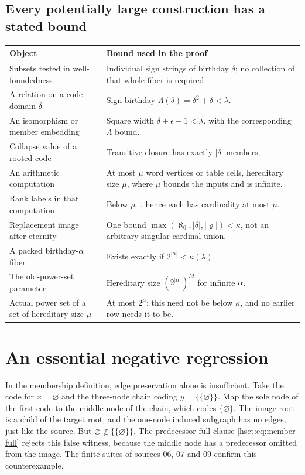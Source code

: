 \documentclass[11pt,letterpaper]{article}
\theoremstyle{definition}
\theoremstyle{remark}
\newcommand{\card}[1]{\lvert#1\rvert}
\begin{document}
\subsection{Every potentially large construction has a stated bound}

\begin{longtable}{@{}P{0.35\textwidth}P{0.56\textwidth}@{}}
\toprule
Object & Bound used in the proof\\
\midrule\endhead
Subsets tested in well-foundedness & Individual sign strings of birthday $\delta$; no collection of that whole fiber is required.\\[0.4em]
A relation on a code domain $\delta$ & Sign birthday $\Lambda(\delta)=\delta^2+\delta<\lambda$.\\[0.4em]
An isomorphism or member embedding & Square width $\delta+\epsilon+1<\lambda$, with the corresponding $\Lambda$ bound.\\[0.4em]
Collapse value of a rooted code & Transitive closure has exactly $\card\delta$ members.\\[0.4em]
An arithmetic computation & At most $\mu$ word vertices or table cells, hereditary size $\mu$, where $\mu$ bounds the inputs and is infinite.\\[0.4em]
Rank labels in that computation & Below $\mu^+$, hence each has cardinality at most $\mu$.\\[0.4em]
Replacement image after eternity & One bound $\max(\aleph_0,\card\delta,\card\varrho)<\kappa$, not an arbitrary singular-cardinal union.\\[0.4em]
A packed birthday-$\alpha$ fiber & Exists exactly if $2^{\card\alpha}<\kappa(\lambda)$.\\[0.4em]
The old-power-set parameter & Hereditary size $(2^{\card\alpha})^M$ for infinite $\alpha$.\\[0.4em]
Actual power set of a set of hereditary size $\mu$ & At most $2^\mu$; this need not be below $\kappa$, and no earlier row needs it to be.\\
\bottomrule
\end{longtable}

\section{An essential negative regression}
\label{hset:app:regression}

In the membership definition, edge preservation alone is insufficient.
Take the code for $x=\varnothing$ and the three-node chain coding
$y=\{\{\varnothing\}\}$. Map the sole node of the first code to the middle
node of the chain, which codes $\{\varnothing\}$. The image root is a child
of the target root, and the one-node induced subgraph has no edges, just
like the source. But $\varnothing\notin\{\{\varnothing\}\}$.
The predecessor-full clause \eqref{hset:eq:member-full} rejects this false
witness, because the middle node has a predecessor omitted from the image.
The finite suites of sources 06, 07 and 09 confirm this counterexample.
\end{document}
